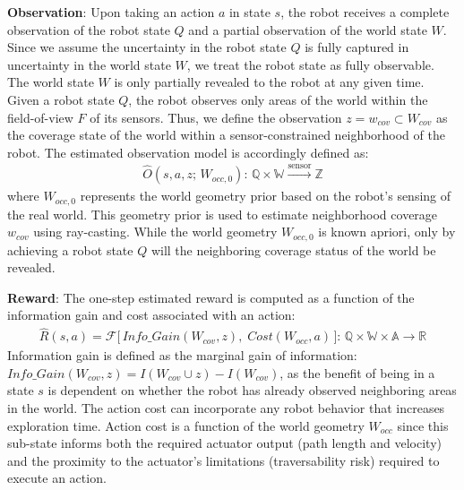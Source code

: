 \documentclass{article}
\newcommand{\ph}[1]{{\textbf{#1}:}} %
\begin{document}

\ph{Observation} Upon taking an action $a$ in state $s$, the robot receives a complete observation of the robot state $Q$ and a partial observation of the world state $W$. Since we assume the uncertainty in the robot state $Q$ is fully captured in uncertainty in the world state $W$, we treat the robot state as fully observable. The world state $W$ is only partially revealed to the robot at any given time. Given a robot state $Q$, the robot observes only areas of the world within the field-of-view $F$ of its sensors. Thus, we define the observation $z = w_{cov} \subset W_{cov}$ as the coverage state of the world within a sensor-constrained neighborhood of the robot. The estimated observation model is accordingly defined as:
\begin{align}
   \hat{O}(s, a, z; \, W_{occ,0}): \, \mathbb{Q} \times \mathbb{W} \xrightarrow{\text{sensor}} \mathbb{Z}
\end{align}
where $W_{occ,0}$ represents the world geometry prior based on the robot's sensing of the real world. This geometry prior is used to estimate neighborhood coverage $w_{cov}$ using ray-casting. While the world geometry $W_{occ,0}$ is known apriori, only by achieving a robot state $Q$ will the neighboring coverage status of the world be revealed.   


\ph{Reward} The one-step estimated reward is computed as a function of the information gain and cost associated with an action:
\begin{align}
    \hat{R}(s, a) = \mathcal{F}\Big[\, \textit{Info\_Gain}(W_{cov}, z), \; \textit{Cost}(W_{occ}, a) \, \Big]: \, \mathbb{Q} \times \mathbb{W} \times \mathbb{A} \rightarrow \mathbb{R} 
\end{align}
Information gain is defined as the marginal gain of information: $\textit{Info\_Gain}(W_{cov}, z) = I(W_{cov} \cup z) - I(W_{cov})$, as the benefit of being in a state $s$ is dependent on whether the robot has already observed neighboring areas in the world. The action cost can incorporate any robot behavior that increases exploration time. Action cost is a function of the world geometry $W_{occ}$ since this sub-state informs both the required actuator output (path length and velocity) and the proximity to the actuator's limitations (traversability risk) required to execute an action.
\end{document}
